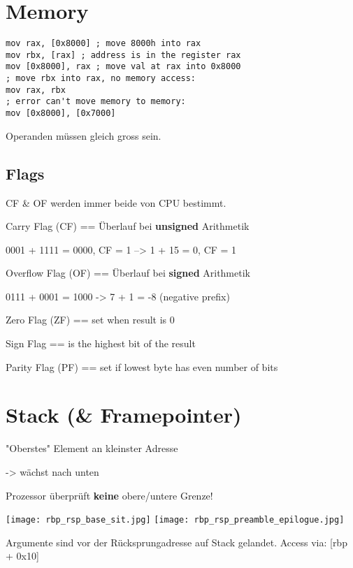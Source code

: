 \begin{multicols*}{4}
\begin{itemize}
\end{itemize}

\section{Memory}
\begin{lstlisting}[language={[x86masm]Assembler}]
mov rax, [0x8000] ; move 8000h into rax
mov rbx, [rax] ; address is in the register rax
mov [0x8000], rax ; move val at rax into 0x8000
; move rbx into rax, no memory access:
mov rax, rbx
; error can't move memory to memory:
mov [0x8000], [0x7000]
\end{lstlisting}
Operanden müssen gleich gross sein.


\subsection{Flags}
CF \& OF werden immer beide von CPU bestimmt.

Carry Flag (CF) == Überlauf bei \textbf{unsigned} Arithmetik

0001 + 1111 = 0000, CF = 1 --> 1 + 15 = 0, CF = 1

Overflow Flag (OF) == Überlauf bei \textbf{signed} Arithmetik

0111 + 0001 = 1000 -> 7 + 1 = -8 (negative prefix)

Zero Flag (ZF) == set when result is 0

Sign Flag == is the highest bit of the result

Parity Flag (PF) == set if lowest byte has even number of bits

\section{Stack (\& Framepointer)}
"Oberstes" Element an kleinster Adresse

-> wächst nach unten

Prozessor überprüft \textbf{keine} obere/untere Grenze!

\texttt{[image: rbp\_rsp\_base\_sit.jpg]}
\texttt{[image: rbp\_rsp\_preamble\_epilogue.jpg]}

Argumente sind vor der Rücksprungadresse auf Stack gelandet. Access via: [rbp + 0x10]


\end{multicols*}
